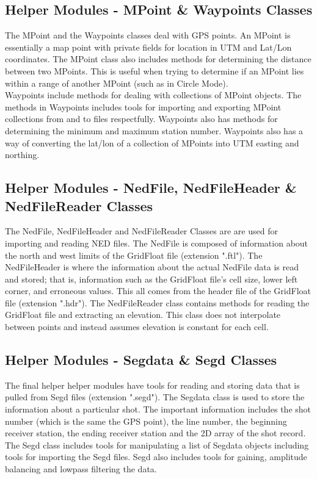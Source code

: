 \documentclass[12pt]{article}
\begin{document}
\subsection{Helper Modules - MPoint \& Waypoints Classes}

The MPoint and the Waypoints classes deal with GPS points. An MPoint is essentially a map point with private fields for location in UTM and Lat/Lon coordinates. The MPoint class also includes methods for determining the distance between two MPoints. This is useful when trying to determine if an MPoint lies within a range of another MPoint (such as in Circle Mode). \\

Waypoints include methods for dealing with collections of MPoint objects. The methods in Waypoints includes tools for importing and exporting MPoint collections from and to files respectfully. Waypoints also has methods for determining the minimum and maximum station number. Waypoints also has a way of converting the lat/lon of a collection of MPoints into UTM easting and northing. 

\subsection{Helper Modules - NedFile, NedFileHeader \& NedFileReader Classes}

The NedFile, NedFileHeader and NedFileReader Classes are are used for importing and reading NED files. The NedFile is composed of information about the north and west limits of the GridFloat file (extension ".ftl"). The NedFileHeader is where the information about the actual NedFile data is read and stored; that is, information such as the GridFloat file's cell size, lower left corner, and erroneous values. This all comes from the header file of the GridFloat file (extension ".hdr"). The NedFileReader class contains methods for reading the GridFloat file and extracting an elevation. This class does not interpolate between points and instead assumes elevation is constant for each cell. 

\subsection{Helper Modules - Segdata \& Segd Classes}

The final helper helper modules have tools for reading and storing data that is pulled from Segd files (extension ".segd"). The Segdata class is used to store the information about a particular shot. The important information includes the shot number (which is the same the GPS point), the line number, the beginning receiver station, the ending receiver station and the 2D array of the shot record. The Segd class includes tools for manipulating a list of Segdata objects including tools for importing the Segd files. Segd also includes tools for gaining, amplitude balancing and lowpass filtering the data.  
\end{document}
